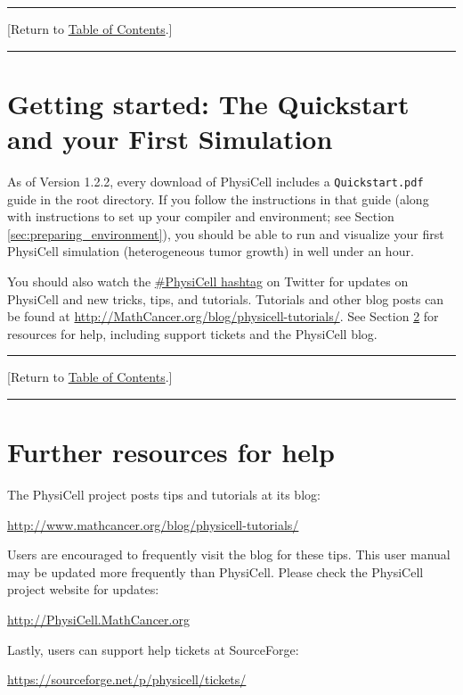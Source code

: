 \documentclass[12pt]{article}
\renewcommand{\v}{\verb}
\newcommand{\TOClink}{\begin{center}\hrule\vskip-10pt\phantom{.}\hfill[Return to \hyperlink{TOC}{Table of Contents}.]\hfill\phantom{.}\vskip3pt\hrule\end{center}}
\begin{document}
\TOClink

\section{Getting started: The Quickstart and your First Simulation}
\label{sec:getting_started}
As of Version 1.2.2, every download of PhysiCell includes a \v|Quickstart.pdf| guide in the root 
directory. If you follow the instructions in that guide (along with instructions to 
set up your compiler and environment; see Section \ref{sec:preparing_environment}), you should 
be able to run and visualize your first PhysiCell simulation (heterogeneous tumor growth) 
in well under an hour. 

You should also watch the \href{https://twitter.com/search?f=tweets&vertical=default&q=PhysiCell&src=typd}{\#PhysiCell hashtag} 
on Twitter for updates on PhysiCell and new tricks, tips, and tutorials. 
Tutorials and other blog posts can be found at 
\href{http://mathcancer.org/blog/physicell-tutorials/}{http://MathCancer.org/blog/physicell-tutorials/}. 
See Section \ref{sec:blog_and_help} for resources for help, including support tickets and the PhysiCell blog. 

\TOClink 

\section{Further resources for help}
\label{sec:blog_and_help}
The PhysiCell project posts tips and tutorials at its blog: 

\begin{center}
\href{http://www.mathcancer.org/blog/physicell-tutorials/}{http://www.mathcancer.org/blog/physicell-tutorials/}
\end{center}

Users are encouraged to frequently visit the blog for these tips. This user manual may 
be updated more frequently than PhysiCell. Please check the PhysiCell project website for 
updates: 

\begin{center}
\href{http://PhysiCell.MathCancer.org}{http://PhysiCell.MathCancer.org}
\end{center}

Lastly, users can support help tickets at SourceForge: 

\begin{center}
\href{https://sourceforge.net/p/physicell/tickets/}{https://sourceforge.net/p/physicell/tickets/}
\end{center}
\end{document}
